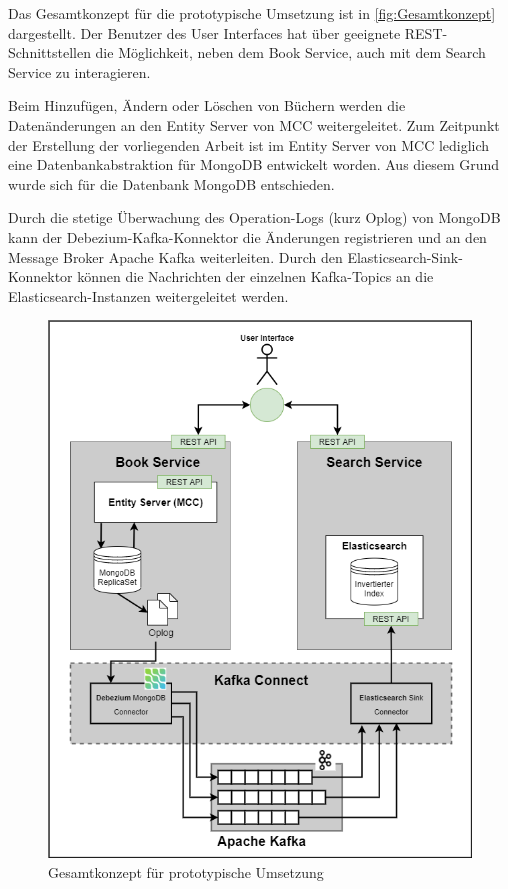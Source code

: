 Das Gesamtkonzept für die prototypische Umsetzung ist in \autoref{fig:Gesamtkonzept} dargestellt. Der Benutzer des User Interfaces hat über geeignete REST-Schnittstellen die Möglichkeit, neben dem Book Service, auch mit dem Search Service zu interagieren.

Beim Hinzufügen, Ändern oder Löschen von Büchern werden die Datenänderungen an den Entity Server von MCC weitergeleitet. Zum Zeitpunkt der Erstellung der vorliegenden Arbeit ist im Entity Server von MCC lediglich eine Datenbankabstraktion für MongoDB entwickelt worden. Aus diesem Grund wurde sich für die Datenbank MongoDB entschieden.

Durch die stetige Überwachung des Operation-Logs (kurz Oplog) von MongoDB kann der Debezium-Kafka-Konnektor die Änderungen registrieren und an den Message Broker \glqq Apache Kafka\grqq{} weiterleiten. Durch den Elasticsearch-Sink-Konnektor können die Nachrichten der einzelnen Kafka-Topics an die Elasticsearch-Instanzen weitergeleitet werden.

\begin{figure}[H]
    \centering
    \includegraphics[width=0.9\linewidth]{images/Gesamtkonzept.png}
    \caption{Gesamtkonzept für prototypische Umsetzung}
    \label{fig:Gesamtkonzept}
\end{figure}